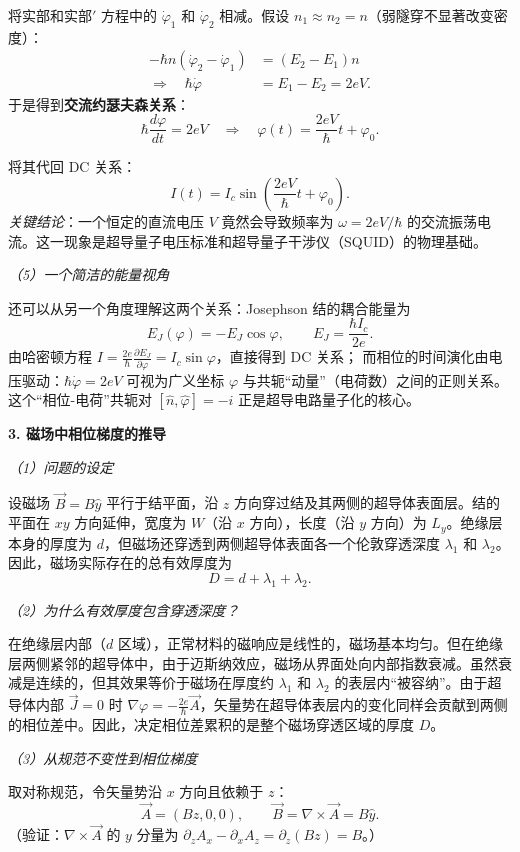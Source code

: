 将实部和实部$'$ 方程中的 $\dot{\varphi}_1$ 和 $\dot{\varphi}_2$ 相减。假设 $n_1 \approx n_2 = n$（弱隧穿不显著改变密度）：
\begin{align*}
-\hbar n(\dot{\varphi}_2 - \dot{\varphi}_1) &= (E_2 - E_1)n \\
\Longrightarrow\quad \hbar\dot{\varphi} &= E_1 - E_2 = 2eV.
\end{align*}
于是得到\textbf{交流约瑟夫森关系}：
\[
\boxed{\hbar\frac{d\varphi}{dt} = 2eV}
\quad\Longrightarrow\quad
\varphi(t) = \frac{2eV}{\hbar}t + \varphi_0.
\]

将其代回 DC 关系：
\[
I(t) = I_c \sin\left( \frac{2eV}{\hbar}t + \varphi_0 \right).
\]
\textit{关键结论}：一个恒定的直流电压 $V$ 竟然会导致频率为 $\omega = 2eV/\hbar$ 的交流振荡电流。这一现象是超导量子电压标准和超导量子干涉仪（SQUID）的物理基础。

\textit{（5）一个简洁的能量视角}

还可以从另一个角度理解这两个关系：Josephson 结的耦合能量为
\[
E_J(\varphi) = -E_J \cos\varphi,
\qquad E_J = \frac{\hbar I_c}{2e}.
\]
由哈密顿方程 $I = \frac{2e}{\hbar}\frac{\partial E_J}{\partial\varphi} = I_c\sin\varphi$，直接得到 DC 关系；
而相位的时间演化由电压驱动：$\hbar\dot{\varphi} = 2eV$ 可视为广义坐标 $\varphi$ 与共轭``动量''（电荷数）之间的正则关系。这个``相位-电荷''共轭对 $[\hat{n}, \hat{\varphi}] = -i$ 正是超导电路量子化的核心。

\textbf{3. 磁场中相位梯度的推导}

\textit{（1）问题的设定}

设磁场 $\vec{B} = B\hat{y}$ 平行于结平面，沿 $z$ 方向穿过结及其两侧的超导体表面层。结的平面在 $xy$ 方向延伸，宽度为 $W$（沿 $x$ 方向），长度（沿 $y$ 方向）为 $L_y$。绝缘层本身的厚度为 $d$，但磁场还穿透到两侧超导体表面各一个伦敦穿透深度 $\lambda_1$ 和 $\lambda_2$。因此，磁场实际存在的总有效厚度为
\[
\boxed{D = d + \lambda_1 + \lambda_2}.
\]

\textit{（2）为什么有效厚度包含穿透深度？}

在绝缘层内部（$d$ 区域），正常材料的磁响应是线性的，磁场基本均匀。但在绝缘层两侧紧邻的超导体中，由于迈斯纳效应，磁场从界面处向内部指数衰减。虽然衰减是连续的，但其效果等价于磁场在厚度约 $\lambda_1$ 和 $\lambda_2$ 的表层内``被容纳''。由于超导体内部 $\vec{J}=0$ 时 $\nabla\varphi = -\frac{2e}{\hbar}\vec{A}$，矢量势在超导体表层内的变化同样会贡献到两侧的相位差中。因此，决定相位差累积的是整个磁场穿透区域的厚度 $D$。

\textit{（3）从规范不变性到相位梯度}

取对称规范，令矢量势沿 $x$ 方向且依赖于 $z$：
\[
\vec{A} = (Bz, 0, 0), \qquad \vec{B} = \nabla\times\vec{A} = B\hat{y}.
\]
（验证：$\nabla\times\vec{A}$ 的 $y$ 分量为 $\partial_z A_x - \partial_x A_z = \partial_z(Bz) = B$。）

